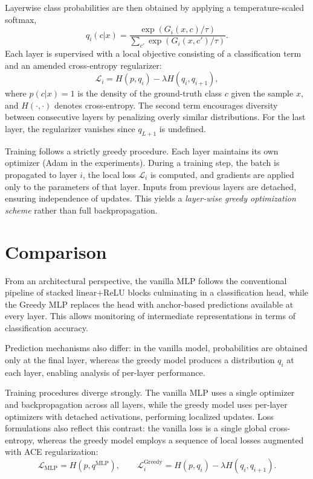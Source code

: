 \documentclass[11pt]{article}
\begin{document}
Layerwise class probabilities are then obtained by applying a temperature-scaled softmax,
\[
  q_i(c|x) = \frac{\exp(G_i(x,c)/\tau)}{\sum_{c'} \exp(G_i(x,c')/\tau)}.
\]
Each layer is supervised with a local objective consisting of a classification term and an amended cross-entropy regularizer:
\[
  \mathcal{L}_i = H(p, q_i) - \lambda H(q_i, q_{i+1}),
\]
where $p(c|x)=1$ is the density of the ground-truth class $c$ given the sample $x$, and $H(\cdot,\cdot)$ denotes cross-entropy. The second term encourages diversity between consecutive layers by penalizing overly similar distributions. For the last layer, the regularizer vanishes since $q_{L+1}$ is undefined.

Training follows a strictly greedy procedure. Each layer maintains its own optimizer (Adam in the experiments). During a training step, the batch is propagated to layer $i$, the local loss $\mathcal{L}_i$ is computed, and gradients are applied only to the parameters of that layer. Inputs from previous layers are detached, ensuring independence of updates. This yields a \emph{layer-wise greedy optimization scheme} rather than full backpropagation.

\section{Comparison}
From an architectural perspective, the vanilla MLP follows the conventional pipeline of stacked linear+ReLU blocks culminating in a classification head, while the Greedy MLP replaces the head with anchor-based predictions available at every layer. This allows monitoring of intermediate representations in terms of classification accuracy.

Prediction mechanisms also differ: in the vanilla model, probabilities are obtained only at the final layer, whereas the greedy model produces a distribution $q_i$ at each layer, enabling analysis of per-layer performance.

Training procedures diverge strongly. The vanilla MLP uses a single optimizer and backpropagation across all layers, while the greedy model uses per-layer optimizers with detached activations, performing localized updates. Loss formulations also reflect this contrast: the vanilla loss is a single global cross-entropy, whereas the greedy model employs a sequence of local losses augmented with ACE regularization:
\[
  \mathcal{L}_{\text{MLP}} = H(p, q^{\text{MLP}}), \qquad
  \mathcal{L}_i^{\text{Greedy}} = H(p, q_i) - \lambda H(q_i, q_{i+1}).
\]
\end{document}

